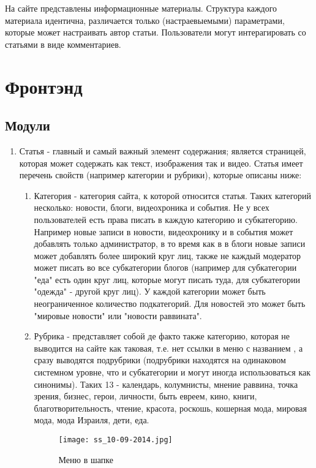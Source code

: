 \documentclass[DIV=calc, paper=a4, fontsize=11pt]{scrartcl} %
\begin{document}
На сайте представлены информационные материалы. Структура каждого материала идентична, различается только (настраевыемыми) параметрами, которые может настраивать автор статьи. Пользователи могут интерагировать со статьями в виде комментариев.

\section{Фронтэнд}
\subsection{Модули}


\begin{enumerate}
\item Статья - главный и самый важный элемент содержания; является страницей, которая может содержать как текст, изображения так и видео. Статья имеет перечень свойств (например категории и рубрики), которые описаны ниже:
    \begin{enumerate}
    \item{Категория} - категория сайта, к которой относится статья. Таких категорий несколько: новости, блоги, видеохроника и события. Не у всех пользователей есть права писать в каждую категорию и субкатегорию. Например новые записи в новости, видеохронику и в события может добавлять только администратор, в то время как в в блоги новые записи может добавлять более широкий круг лиц, также не каждый модератор может писать во все субкатегории блогов (например для субкатегории "еда" есть один круг лиц, которые могут писать туда, для субкатегории "одежда" - другой круг лиц). У каждой категории может быть неограниченное количество \label{subcategory} подкатегорий. Для новостей это может быть "мировые новости" или "новости раввината".
    \item{Рубрика} - представляет собой де факто также категорию, которая не выводится на сайте как таковая, т.е. нет ссылки в меню с названием , а сразу выводятся подрубрики (подрубрики находятся на одинаковом системном уровне, что и субкатегории и могут иногда использоваться как синонимы). Таких 13 - календарь, колумнисты, мнение раввина, точка зрения, бизнес, герои, личности, быть евреем, кино, книги, благотворительность, чтение, красота, роскошь, кошерная мода, мировая мода, мода Израиля, дети, еда.
        \begin{figure}[ht!]
        \centering
        \texttt{[image: ss\_10-09-2014.jpg]}
        \caption{Меню в шапке \label{overflow}}

\end{figure}
\end{enumerate}
\end{enumerate}
\end{document}
